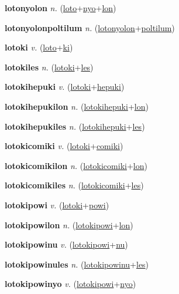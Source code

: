 \textbf{\hypertarget{lotonyolon}{lotonyolon}} \textit{n.} (\hyperlink{loto}{loto}+\allowbreak \hyperlink{nyo}{nyo}+\allowbreak \hyperlink{lon}{lon})


\textbf{\hypertarget{lotonyolonpoltilum}{lotonyolonpoltilum}} \textit{n.} (\hyperlink{lotonyolon}{lotonyolon}+\allowbreak \hyperlink{poltilum}{poltilum})


\textbf{\hypertarget{lotoki}{lotoki}} \textit{v.} (\hyperlink{loto}{loto}+\allowbreak \hyperlink{ki}{ki})


\textbf{\hypertarget{lotokiles}{lotokiles}} \textit{n.} (\hyperlink{lotoki}{lotoki}+\allowbreak \hyperlink{les}{les})


\textbf{\hypertarget{lotokihepuki}{lotokihepuki}} \textit{v.} (\hyperlink{lotoki}{lotoki}+\allowbreak \hyperlink{hepuki}{hepuki})


\textbf{\hypertarget{lotokihepukilon}{lotokihepukilon}} \textit{n.} (\hyperlink{lotokihepuki}{lotokihepuki}+\allowbreak \hyperlink{lon}{lon})


\textbf{\hypertarget{lotokihepukiles}{lotokihepukiles}} \textit{n.} (\hyperlink{lotokihepuki}{lotokihepuki}+\allowbreak \hyperlink{les}{les})


\textbf{\hypertarget{lotokicomiki}{lotokicomiki}} \textit{v.} (\hyperlink{lotoki}{lotoki}+\allowbreak \hyperlink{comiki}{comiki})


\textbf{\hypertarget{lotokicomikilon}{lotokicomikilon}} \textit{n.} (\hyperlink{lotokicomiki}{lotokicomiki}+\allowbreak \hyperlink{lon}{lon})


\textbf{\hypertarget{lotokicomikiles}{lotokicomikiles}} \textit{n.} (\hyperlink{lotokicomiki}{lotokicomiki}+\allowbreak \hyperlink{les}{les})


\textbf{\hypertarget{lotokipowi}{lotokipowi}} \textit{v.} (\hyperlink{lotoki}{lotoki}+\allowbreak \hyperlink{powi}{powi})


\textbf{\hypertarget{lotokipowilon}{lotokipowilon}} \textit{n.} (\hyperlink{lotokipowi}{lotokipowi}+\allowbreak \hyperlink{lon}{lon})


\textbf{\hypertarget{lotokipowinu}{lotokipowinu}} \textit{v.} (\hyperlink{lotokipowi}{lotokipowi}+\allowbreak \hyperlink{nu}{nu})


\textbf{\hypertarget{lotokipowinules}{lotokipowinules}} \textit{n.} (\hyperlink{lotokipowinu}{lotokipowinu}+\allowbreak \hyperlink{les}{les})


\textbf{\hypertarget{lotokipowinyo}{lotokipowinyo}} \textit{v.} (\hyperlink{lotokipowi}{lotokipowi}+\allowbreak \hyperlink{nyo}{nyo})


